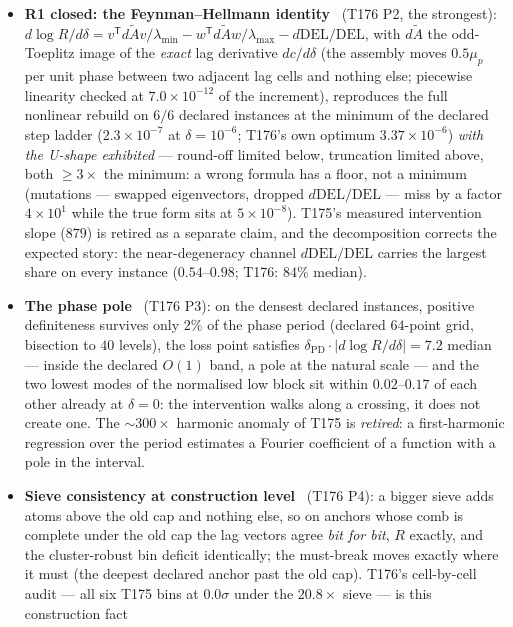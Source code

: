 \documentclass[11pt,a4paper]{article}
\begin{document}
\begin{itemize}[leftmargin=1.5em]
\item \textbf{R1 closed: the Feynman--Hellmann identity} \mE\ (T176 P2, the
strongest): $d\log R/d\delta=v^{\mathsf T}d\tilde Av/\lambda_{\min}
-w^{\mathsf T}d\tilde Aw/\lambda_{\max}-d\mathrm{DEL}/\mathrm{DEL}$, with $d\tilde A$
the odd-Toeplitz image of the \emph{exact} lag derivative $dc/d\delta$ (the assembly
moves $0.5\mu_p$ per unit phase between two adjacent lag cells and nothing else;
piecewise linearity checked at $7.0\times10^{-12}$ of the increment), reproduces the
full nonlinear rebuild on $6/6$ declared instances at the minimum of the declared
step ladder ($2.3\times10^{-7}$ at $\delta=10^{-6}$; T176's own optimum
$3.37\times10^{-6}$) \emph{with the U-shape exhibited} --- round-off limited below,
truncation limited above, both $\ge3\times$ the minimum: a wrong formula has a floor,
not a minimum (mutations --- swapped eigenvectors, dropped
$d\mathrm{DEL}/\mathrm{DEL}$ --- miss by a factor $4\times10^{1}$ while the true form
sits at $5\times10^{-8}$). T175's measured intervention slope ($879$) is retired as a
separate claim, and the decomposition corrects the expected story: the near-degeneracy
channel $d\mathrm{DEL}/\mathrm{DEL}$ carries the largest share on every instance
($0.54$--$0.98$; T176: $84\%$ median).
\item \textbf{The phase pole} \mE\ (T176 P3): on the densest declared instances,
positive definiteness survives only $2\%$ of the phase period (declared $64$-point
grid, bisection to $40$ levels), the loss point satisfies
$\delta_{\mathrm{PD}}\cdot|d\log R/d\delta|=7.2$ median --- inside the declared
$O(1)$ band, a pole at the natural scale --- and the two lowest modes of the
normalised low block sit within $0.02$--$0.17$ of each other already at $\delta=0$:
the intervention walks along a crossing, it does not create one. The ${\sim}300\times$
harmonic anomaly of T175 is \emph{retired}: a first-harmonic regression over the
period estimates a Fourier coefficient of a function with a pole in the interval.
\item \textbf{Sieve consistency at construction level} \mE\ (T176 P4): a bigger sieve
adds atoms above the old cap and nothing else, so on anchors whose comb is complete
under the old cap the lag vectors agree \emph{bit for bit}, $R$ exactly, and the
cluster-robust bin deficit identically; the must-break moves exactly where it must
(the deepest declared anchor past the old cap). T176's cell-by-cell audit --- all six
T175 bins at $0.0\sigma$ under the $20.8\times$ sieve --- is this construction fact

\end{itemize}
\end{document}
